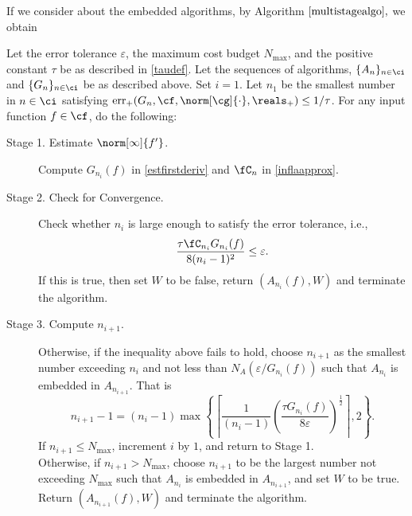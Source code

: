 If we consider about the embedded algorithms, by Algorithm $\ref{multistagealgo},$ we obtain
\begin{algo} \label{multistageapproalgo}
Let the error tolerance $\varepsilon$, the maximum cost budget $N_{\max}$, and the positive constant $\tau$ be as described in  \eqref{taudef}. Let the sequences of algorithms, $\{A_n\}_{n \in \ci}$ and  $\{G_n\}_{n \in \ci}$ be as described above.  Set $i=1$.  Let $n_1$ be the smallest number in $n \in \ci$ satisfying $\err_+(G_n,\cf,\norm[\cg]{\cdot},\reals_+) \le 1/\tau$. For any input function $f \in \cf$, do the following:
\begin{description}

\item [Stage 1. Estimate {$\norm[\infty]{f'} $}.]
Compute $G_{n_i}(f)$ in \eqref{estfirstderiv} and $\fC_n$ in \eqref{inflaapprox}.
\item [Stage 2. Check for Convergence.]
 Check whether $n_i$ is large enough to satisfy the error tolerance, i.e.,
$$
\frac{\tau \fC_{n_i} G_{n_i}(f)}{8(n_i-1)^2} \le \varepsilon.
$$
If this is true, then set $W$ to be false, return $(A_{n_i}(f),W)$ and terminate the algorithm.


\item[Stage 3. Compute $n_{i+1}$.]  Otherwise, if the inequality above fails to hold,
choose $n_{i+1}$ as the smallest number exceeding $n_i$ and not less than $N_{A}(\varepsilon /G_{n_i}(f))$ such that $A_{n_{i}}$ is embedded in $A_{n_{i+1}}$. That is
$$n_{i+1}-1=(n_i-1)\max\left\{\left\lceil\frac{1}{(n_i-1)}\left(\frac{\tau G_{n_i}(f)}{8\varepsilon}\right)^{\frac{1}{2}}\right\rceil,2\right\}.$$
 If $n_{i+1} \le N_{\max}$, increment $i$ by $1$, and return to Stage 1.\\
Otherwise, if $n_{i+1} > N_{\max}$, choose $n_{i+1}$ to be the largest number not exceeding $N_{\max}$ such that $A_{n_{i}}$ is embedded in $A_{n_{i+1}}$, and set $W$ to be true. Return $(A_{n_{i+1}}(f),W)$ and terminate the algorithm.
\end{description}
\end{algo}

